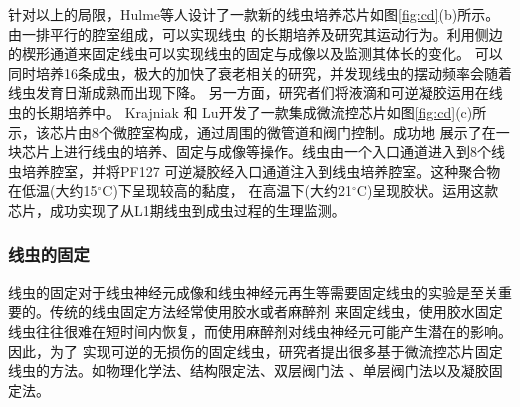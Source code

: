 	针对以上的局限，Hulme等人\cite{Hulme2010Lifespan}设计了一款新的线虫培养芯片如图\ref{fig:cd}(b)所示。
	由一排平行的腔室组成，可以实现线虫
	的长期培养及研究其运动行为。利用侧边的楔形通道来固定线虫可以实现线虫的固定与成像以及监测其体长的变化。
	可以同时培养16条成虫，极大的加快了衰老相关的研究，并发现线虫的摆动频率会随着线虫发育日渐成熟而出现下降。
	另一方面，研究者们将液滴和可逆凝胶运用在线虫的长期培养中\cite{Aubry2015Hydrogel,Krajniak2010Long,Wen2015A,Cornaglia2016Automated}。
	Krajniak 和 Lu\cite{Krajniak2010Long}开发了一款集成微流控芯片如图\ref{fig:cd}(c)所示，该芯片由8个微腔室构成，通过周围的微管道和阀门控制。成功地
	展示了在一块芯片上进行线虫的培养、固定与成像等操作。线虫由一个入口通道进入到8个线虫培养腔室，并将PF127
	可逆凝胶经入口通道注入到线虫培养腔室。这种聚合物在低温(大约15$^\circ$C)下呈现较高的黏度，
	在高温下(大约21$^\circ$C)呈现胶状。运用这款芯片，成功实现了从L1期线虫到成虫过程的生理监测。
\subsubsection{线虫的固定}
\label{sec:intro:analog}
	线虫的固定对于线虫神经元成像和线虫神经元再生\cite{Gokce2014A}等需要固定线虫的实验是至关重要的。传统的线虫固定方法经常使用胶水或者麻醉剂
	来固定线虫，使用胶水固定线虫往往很难在短时间内恢复，而使用麻醉剂对线虫神经元可能产生潜在的影响。因此，为了
	实现可逆的无损伤的固定线虫，研究者提出很多基于微流控芯片固定线虫的方法。如物理化学法、结构限定法、双层阀门法
	、单层阀门法以及凝胶固定法。
	
